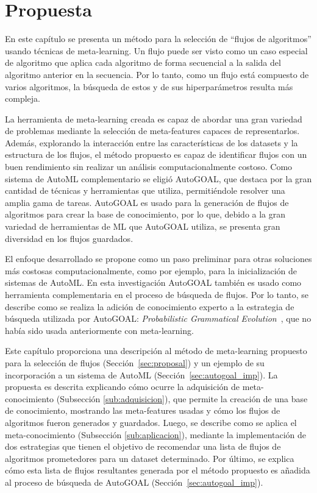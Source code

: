 \chapter{Propuesta}\label{chapter:proposal}


%


En este capítulo se presenta un método para la selección de ``flujos de algoritmos'' usando técnicas de meta-learning. Un flujo puede ser visto como un caso especial de algoritmo que aplica cada algoritmo de forma secuencial a la salida del algoritmo anterior en la secuencia. Por lo tanto, como un flujo está compuesto de varios algoritmos, la búsqueda de estos y de sus hiperparámetros resulta más compleja. 


La herramienta de meta-learning creada es capaz de abordar una gran variedad de problemas mediante la selección de meta-features capaces de representarlos. Además, explorando la interacción entre las características de los datasets y la estructura de los flujos, el método propuesto es capaz de identificar flujos con un buen rendimiento sin realizar un análisis computacionalmente costoso. Como sistema de AutoML complementario se eligió AutoGOAL, que destaca por la gran cantidad de técnicas y herramientas que utiliza, permitiéndole resolver una amplia gama de tareas. AutoGOAL es usado para la generación de flujos de algoritmos para crear la base de conocimiento, por lo que, debido a la gran variedad de herramientas de ML que AutoGOAL utiliza, se presenta gran diversidad en los flujos guardados.


El enfoque desarrollado se propone como un paso preliminar para otras soluciones más costosas computacionalmente, como por ejemplo, para la inicialización de sistemas de AutoML. En esta investigación AutoGOAL también es usado como herramienta complementaria en el proceso de búsqueda de flujos. Por lo tanto, se describe como se realiza la adición de conocimiento experto a la estrategia de búsqueda utilizada por AutoGOAL: \textit{Probabilistic Grammatical Evolution}~\cite{pge2015}, que no había sido usada anteriormente con meta-learning.


Este capítulo proporciona una descripción al método de meta-learning propuesto para la selección de flujos (Sección~\ref{sec:proposal}) y un ejemplo de su incorporación a un sistema de AutoML (Sección~\ref{sec:autogoal_imp}). La propuesta es descrita explicando cómo ocurre la adquisición de meta-conocimiento (Subsección \ref{sub:adquisicion}), que permite la creación de una base de conocimiento, mostrando las meta-features usadas y cómo los flujos de algoritmos fueron generados y guardados. Luego, se describe como se aplica el meta-conocimiento (Subsección \ref{sub:aplicacion}), mediante la implementación de dos estrategias que tienen el objetivo de recomendar una lista de flujos de algoritmos prometedores para un dataset determinado. Por último, se explica cómo esta lista de flujos resultantes generada por el método propuesto es añadida al proceso de búsqueda de AutoGOAL (Sección~\ref{sec:autogoal_imp}).

